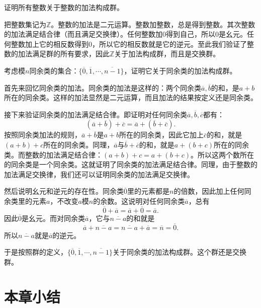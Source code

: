\documentclass[12pt,UTF8,fontset=none]{ctexbook}
\begin{document}
\begin{et}
    证明所有整数关于整数的加法构成群。
\end{et}
\begin{so}
    把整数集记为$\mathbb{Z}$。整数的加法是二元运算。整数加整数，总是得到整数。其次整数的加法满足结合律（而且满足交换律）。任何整数加$0$得到自己，所以$0$是幺元。任何整数加上它的相反数得到$0$，所以它的相反数就是它的逆元。至此我们验证了整数的加法满足群的所有要求，因此$\mathbb{Z}$关于加法构成群，而且是交换群。
\end{so}

\begin{et}
    考虑模$n$同余类的集合：$\{\overline{0},\overline{1},\cdots, \overline{n-1}\}$，证明它关于同余类的加法构成群。
\end{et}
\begin{so}
    首先来回忆同余类的加法。同余类的加法是这样的：两个同余类$\overline{a},\overline{b}$的和，是$a+b$所在的同余类。这样的加法显然是二元运算，而且加法的结果按定义还是同余类。

    接下来验证同余类的加法满足结合律。即证明对任何同余类$\overline{a},\overline{b},\overline{c}$都有：
    $$ \left(\overline{a} + \overline{b}\right) + \overline{c} = \overline{a} + \left(\overline{b} + \overline{c}\right). $$
    按照同余类加法的规则，$\overline{a} + \overline{b}$是$a+b$所在的同余类，因此它加上$\overline{c}$的和，就是$(a+b)+c$所在的同余类。同理，$\overline{a}$与$\overline{b} + \overline{c}$的和，就是$a+(b+c)$所在的同余类。而整数的加法满足结合律：$(a+b)+c = a+(b+c)$。所以这两个数所在的同余类是一个同余类。这就证明了同余类的加法满足结合律。同理，由于整数的加法满足交换律，我们还可以证明同余类的加法满足交换律。

    然后说明幺元和逆元的存在性。同余类$\overline{0}$里的元素都是$n$的倍数，因此加上任何同余类里的元素$a$，不改变$a$模$n$的余数。这说明对任何同余类$\overline{a}$，总有
    $$ \overline{0} + \overline{a} = \overline{a} + \overline{0} = \overline{a}. $$
    因此$\overline{0}$是幺元。而对同余类$\overline{a}$，它与$\overline{n - a}$的和就是
    $$\overline{a} + \overline{n - a} = \overline{n - a} + \overline{a} = \overline{n} = \overline{0}.$$
    所以$\overline{n - a}$就是$\overline{a}$的逆元。

    于是按照群的定义，$\{\overline{0},\overline{1},\cdots, \overline{n-1}\}$关于同余类的加法构成群。这个群还是交换群。
\end{so}

\clearpage
\section*{本章小结}
\end{document}
